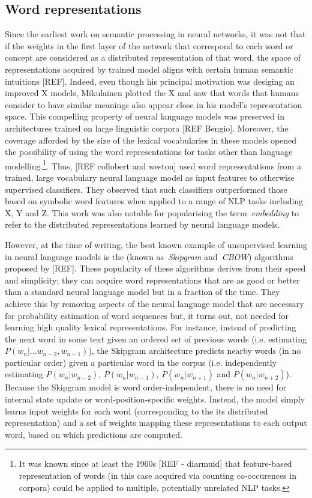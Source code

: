 \documentclass[11pt,letterpaper]{article}
\begin{document}
\subsection{Word representations}
Since the earliest work on semantic processing in neural networks, it was not that if the weights in the first layer of the network that correspond to each word or concept are considered as a distributed representation of that word, the space of representations acquired by trained model aligns with certain human semantic intuitions [REF]. Indeed, even though his principal motivation was desiging an improved X models, Mikulainen plotted the X and saw that words that humans consider to have similar meanings also appear close in his model's representation space. This compelling property of neural language models was preserved in architectures trained on large linguistic corpora [REF Bengio].  Moreover, the coverage afforded by the size of the lexical vocabularies in these models opened the possibility of using the word representations for tasks other than language modelling.\footnote{It was known since at least the 1960s [REF - diarmuid] that feature-based representation of words (in this case acquired via counting co-occurences in corpora) could be applied to multiple, potentially unrelated NLP tasks.}. Thus, [REF collobert and weston] used word representations from a trained, large vocabulary neural language model as input features to otherwise supervised classifiers. They observed that such classifiers outperformed those based on symbolic word features when applied to a range of NLP tasks including X, Y and Z. This work was also notable for popularising the term~\emph{embedding} to refer to the distributed representations learned by neural language models.  

However, at the time of writing, the best known example of unsupervised learning in neural language models is the (known as~\emph{Skipgram} and~\emph{CBOW}) algorithms proposed by [REF]. These popularity of these algorithms derives from their speed and simplicity; they can acquire word representations that are as good or better than a standard neural language model but in a fraction of the time. They achieve this by removing aspects of the neural language model that are necessary for probability estimation of  word sequences but, it turns out, not needed for learning high quality lexical representations. For instance, instead of predicting the next word in some text given an ordered set of previous words (i.e. estimating $P(w_n | \dots w_{n-2}, w_{n-1})$), the Skipgram architecture predicts nearby words (in no particular order) given a particular word in the corpus (i.e. independently estimating $P(w_n | w_{n-2})$, $P(w_n | w_{n-1})$, $P(w_n | w_{n+1})$ and $P(w_n | w_{n+2})$). Because the Skipgram model is word order-independent, there is no need for internal state update or word-position-specific weights. Instead, the model simply learns input weights for each word (corresponding to the its distributed representation) and a set of weights mapping these representations to each output word, based on which predictions are computed. 
\end{document}
